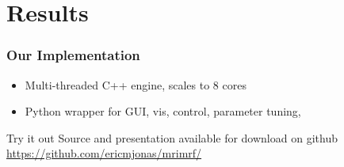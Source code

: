 \documentclass[compress]{beamer}
\begin{document}
\section{Results}
\frame{\tableofcontents[currentsection]}

\begin{frame}
  \frametitle{Our Implementation}
  \begin{itemize}
  \item Multi-threaded C++ engine, scales to 8 cores
  \item Python wrapper for GUI, vis, control, parameter tuning, 
  \end{itemize}
  
  \pause
  \begin{block}{Try it out}
    Source and presentation available for download on github
    \url{https://github.com/ericmjonas/mrimrf/}
  \end{block}

\end{frame}
\end{document}
